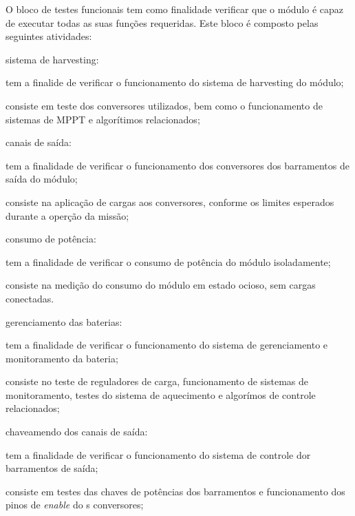 O bloco de testes funcionais tem como finalidade verificar que o módulo é capaz de executar todas as suas funções requeridas.
Este bloco é composto pelas seguintes atividades:

\begin{alineas}
    \item sistema de harvesting:
    \begin{alineas}
        \item tem a finalide de verificar o funcionamento do sistema de harvesting do módulo;
        \item consiste em teste dos conversores utilizados, bem como o funcionamento de sistemas de \gls{MPPT} e algorítimos relacionados;
    \end{alineas}

    \item canais de saída:
    \begin{alineas}
        \item tem a finalidade de verificar o funcionamento dos conversores dos barramentos de saída do módulo;
        \item consiste na aplicação de cargas aos conversores, conforme os limites esperados durante a operção da missão;
    \end{alineas}

    \item consumo de potência:
    \begin{alineas}
        \item tem a finalidade de verificar o consumo de potência do módulo isoladamente;
        \item consiste na medição do consumo do módulo em estado ocioso, sem cargas conectadas.
    \end{alineas}

    \item gerenciamento das baterias:
    \begin{alineas}
        \item tem a finalidade de verificar o funcionamento do sistema de gerenciamento e monitoramento da bateria;
        \item consiste no teste de reguladores de carga, funcionamento de sistemas de monitoramento, testes do sistema de aquecimento e algorímos de controle relacionados;
    \end{alineas}

    \item chaveamendo dos canais de saída:
    \begin{alineas}
        \item tem a finalidade de verificar o funcionamento do sistema de controle dor barramentos de saída;
        \item consiste em testes das chaves de potências dos barramentos e funcionamento dos pinos de \textit{enable} do s conversores;
    \end{alineas}


\end{alineas}
